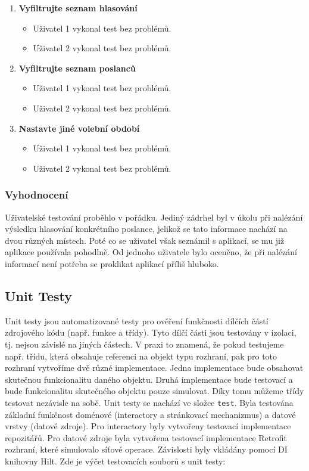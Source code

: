 \begin{enumerate}
	
	\item \textbf{Vyfiltrujte seznam hlasování}
	
		\begin{itemize}
			\item Uživatel 1 vykonal test bez problémů.
			\item Uživatel 2 vykonal test bez problémů.
		\end{itemize}
	
	
	\item \textbf{Vyfiltrujte seznam poslanců}
	
		\begin{itemize}
			\item Uživatel 1 vykonal test bez problémů.
			\item Uživatel 2 vykonal test bez problémů.
		\end{itemize}
	
		\item \textbf{Nastavte jiné volební období}
	
		\begin{itemize}
			\item Uživatel 1 vykonal test bez problémů.
			\item Uživatel 2 vykonal test bez problémů.
		\end{itemize}
\end{enumerate}

\subsubsection*{Vyhodnocení}
Uživatelské testování proběhlo v pořádku. Jediný zádrhel byl v úkolu při nalézání výsledku hlasování konkrétního poslance, jelikož se tato informace nachází na dvou různých místech. Poté co se uživatel však seznámil s aplikací, se mu již aplikace používala pohodlně. Od jednoho uživatele bylo oceněno, že při nalézání informací není potřeba se proklikat aplikací příliš hluboko.

\subsection{Unit Testy}
Unit testy jsou automatizované testy pro ověření funkčnosti dílčích částí zdrojového kódu (např. funkce a třídy). Tyto dílčí části jsou testovány v izolaci, tj. nejsou závislé na jiných částech. V praxi to znamená, že pokud testujeme např. třídu, která obsahuje referenci na objekt typu rozhraní, pak pro toto rozhraní vytvoříme dvě různé implementace. Jedna implementace bude obsahovat skutečnou funkcionalitu daného objektu. Druhá implementace bude testovací a bude funkcionalitu skutečného objektu pouze simulovat. Díky tomu můžeme třídy testovat nezávisle na sobě. Unit testy se nachází ve složce \texttt{test}. Byla testována základní funkčnost doménové (interactory a stránkovací mechanizmus) a datové vrstvy (datové zdroje). Pro interactory byly vytvořeny testovací implementace repozitářů. Pro datové zdroje byla vytvořena testovací implementace Retrofit rozhraní, které simulovalo síťové operace. Závislosti byly vkládány pomocí DI knihovny Hilt. Zde je výčet testovacích souborů s unit testy:

